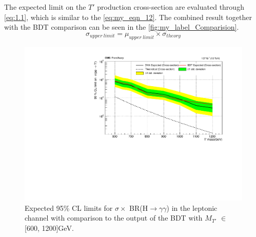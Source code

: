 The expected limit on the ${T'}$ production cross-section are evaluated through \autoref{eq:1.1}, which is similar to the \autoref{eq:my_eqn_12}. The combined result together with the BDT comparison can be seen in the \autoref{fig:my_label_Comparision}.
\begin{equation} \label{eq:1.1}
    \sigma_{upper\ limit} = \mu_{upper\ limit} \times \sigma_{theory}
\end{equation}


\begin{figure}[H]
    \centering
    \includegraphics[scale=0.8]{figure_4/muALL_Plot_600-1200_with_cross_Section_comparision.pdf}
    \caption{Expected 95\% CL limits for $\sigma \times$ BR(H$\longrightarrow$$\gamma\gamma$)  in the leptonic channel with comparison to the output of the BDT with $M_{T'}$ $\in$ [600, 1200]GeV.}
    \label{fig:my_label_Comparision}
\end{figure}






























